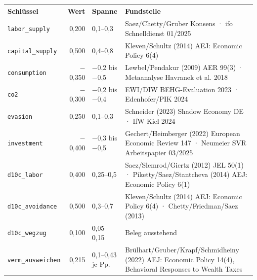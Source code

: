 \begin{longtable}{@{}p{2.6cm}rp{2.2cm}p{8.4cm}@{}}
\toprule
Schlüssel & Wert & Spanne & Fundstelle \\
\midrule
\endhead
\texttt{labor\_supply} & 0,200 & 0,1–0,3 & Saez/Chetty/Gruber Konsens · ifo Schnelldienst 01/2025 \\
\texttt{capital\_supply} & 0,500 & 0,4–0,8 & Kleven/Schultz (2014) AEJ: Economic Policy 6(4) \\
\texttt{consumption} & $-$0,350 & −0,2 bis −0,5 & Lewbel/Pendakur (2009) AER 99(3) · Metaanalyse Havranek et al. 2018 \\
\texttt{co2} & $-$0,300 & −0,2 bis −0,4 & EWI/DIW BEHG-Evaluation 2023 · Edenhofer/PIK 2024 \\
\texttt{evasion} & 0,250 & 0,1–0,3 & Schneider (2023) Shadow Economy DE · IfW Kiel 2024 \\
\texttt{investment} & $-$0,400 & −0,3 bis −0,5 & Gechert/Heimberger (2022) European Economic Review 147 · Neumeier SVR Arbeitspapier 03/2025 \\
\texttt{d10c\_labor} & 0,400 & 0,25–0,5 & Saez/Slemrod/Giertz (2012) JEL 50(1) · Piketty/Saez/Stantcheva (2014) AEJ: Economic Policy 6(1) \\
\texttt{d10c\_avoidance} & 0,500 & 0,3–0,7 & Kleven/Schultz (2014) AEJ: Economic Policy 6(4) · Chetty/Friedman/Saez (2013) \\
\texttt{d10c\_wegzug} & 0,100 & 0,05–0,15 & Beleg ausstehend \\
\texttt{verm\_ausweichen} & 0,215 & 0,1–0,43 je Pp. & Brülhart/Gruber/Krapf/Schmidheiny (2022) AEJ: Economic Policy 14(4), Behavioral Responses to Wealth Taxes \\
\bottomrule
\end{longtable}
